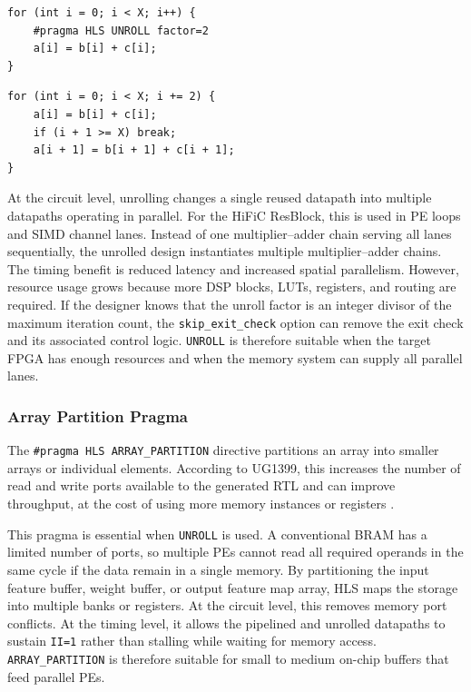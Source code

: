 \begin{lstlisting}[caption={Pseudo-code before partial loop unrolling},label={lst:hls_unroll_original}]
for (int i = 0; i < X; i++) {
    #pragma HLS UNROLL factor=2
    a[i] = b[i] + c[i];
}
\end{lstlisting}

\begin{lstlisting}[caption={Equivalent pseudo-code after unrolling by factor 2},label={lst:hls_unroll_exit_check}]
for (int i = 0; i < X; i += 2) {
    a[i] = b[i] + c[i];
    if (i + 1 >= X) break;
    a[i + 1] = b[i + 1] + c[i + 1];
}
\end{lstlisting}

At the circuit level, unrolling changes a single reused datapath into multiple datapaths operating in parallel. For the HiFiC ResBlock, this is used in PE loops and SIMD channel lanes. Instead of one multiplier--adder chain serving all lanes sequentially, the unrolled design instantiates multiple multiplier--adder chains. The timing benefit is reduced latency and increased spatial parallelism. However, resource usage grows because more DSP blocks, LUTs, registers, and routing are required. If the designer knows that the unroll factor is an integer divisor of the maximum iteration count, the \texttt{skip\_exit\_check} option can remove the exit check and its associated control logic. \texttt{UNROLL} is therefore suitable when the target FPGA has enough resources and when the memory system can supply all parallel lanes.

\subsubsection{Array Partition Pragma}

The \texttt{\#pragma HLS ARRAY\_PARTITION} directive partitions an array into smaller arrays or individual elements. According to UG1399, this increases the number of read and write ports available to the generated RTL and can improve throughput, at the cost of using more memory instances or registers \cite{amd2026vitisHls}.

This pragma is essential when \texttt{UNROLL} is used. A conventional BRAM has a limited number of ports, so multiple PEs cannot read all required operands in the same cycle if the data remain in a single memory. By partitioning the input feature buffer, weight buffer, or output feature map array, HLS maps the storage into multiple banks or registers. At the circuit level, this removes memory port conflicts. At the timing level, it allows the pipelined and unrolled datapaths to sustain \texttt{II=1} rather than stalling while waiting for memory access. \texttt{ARRAY\_PARTITION} is therefore suitable for small to medium on-chip buffers that feed parallel PEs.

